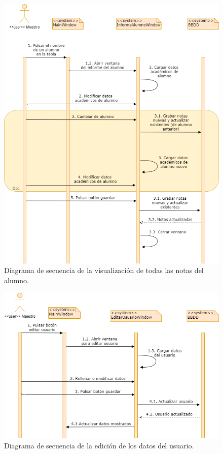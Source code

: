 \begin{figure}[H]
\centering\includegraphics[width=1\linewidth]{figs/dia_informealumno.png}
\caption{Diagrama de secuencia de la visualización de todas las notas del alumno.}
\label{Fig:dia_informealumno}
\end{figure}

\begin{figure}[h]
\centering\includegraphics[width=0.75\linewidth]{figs/dia_editarusuario.png}
\caption{Diagrama de secuencia de la edición de los datos del usuario.}
\label{Fig:dia_editarusuario}
\end{figure}

